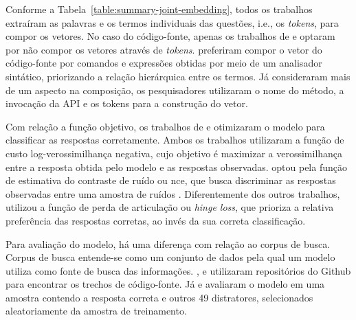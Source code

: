 Conforme a Tabela~\ref{table:summary-joint-embedding}, todos os trabalhos extraíram as palavras e os termos individuais das questões, i.e., os \textit{tokens}, para compor os vetores. No caso do código-fonte, apenas os trabalhos de \cite{Allamanis-bimodal-source-code-natural-language:2015} e \cite{Gu-deep-code-search:2018} optaram por não compor os vetores através de \textit{tokens}. \cite{Allamanis-bimodal-source-code-natural-language:2015} preferiram compor o vetor do código-fonte por comandos e expressões obtidas por meio de um analisador sintático, priorizando a relação hierárquica entre os termos. Já \cite{Gu-deep-code-search:2018} consideraram mais de um aspecto na composição, os pesquisadores utilizaram o nome do método, a invocação da API e os tokens para a construção do vetor.


Com relação a função objetivo, os trabalhos de \cite{iyer-etal-2016-summarizing} e \cite{Chen-bi-variational-autoencoder:2018} otimizaram o modelo para classificar as respostas corretamente. Ambos os trabalhos utilizaram a função de custo log-verossimilhança negativa, cujo objetivo é maximizar a verossimilhança entre a resposta obtida pelo modelo e as respostas observadas. \cite{Allamanis-bimodal-source-code-natural-language:2015} optou pela função de estimativa do contraste de ruído ou \acrfull{nce}, que busca discriminar as respostas observadas entre uma amostra de ruídos \citep{gutmann-nce-noise-contrastive-estimation-2010}. Diferentemente dos outros trabalhos, \cite{Gu-deep-code-search:2018} utilizou a função de perda de articulação ou \textit{hinge loss}, que prioriza a relativa preferência das respostas corretas, ao invés da sua correta classificação. 

Para avaliação do modelo, há uma diferença com relação ao corpus de busca. Corpus de busca entende-se como um conjunto de dados pela qual um modelo utiliza como fonte de busca das informações. \cite{Gu-deep-code-search:2018}, \cite{Sachdev-neural-code-search:2018} e \cite{cambronero-deep-learning-code-search:2019} utilizaram repositórios do Github para encontrar os trechos de código-fonte. Já \cite{iyer-etal-2016-summarizing} e \cite{Chen-bi-variational-autoencoder:2018} avaliaram o modelo em uma amostra contendo a resposta correta e outros 49 distratores, selecionados aleatoriamente da amostra de treinamento. 

